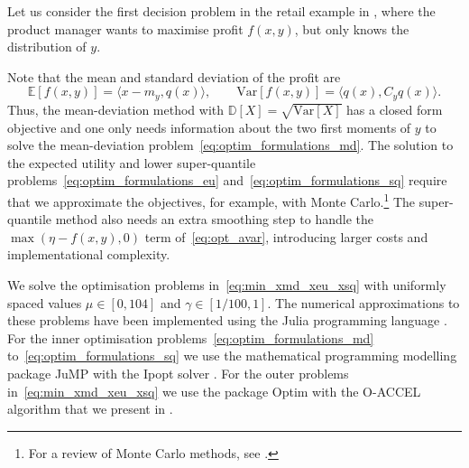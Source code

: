 \documentclass[main.tex]{subfiles}
\begin{document}
\begin{example}
  Let us consider the first decision problem in the retail example in
  , where the product manager wants
  to maximise profit $f(x,y)$, but only knows the distribution of $y$.

  Note that the mean and standard deviation of the profit are
  \begin{equation}
    \mathbb{E}[f(x,y)]
    = \langle x-m_y,q(x) \rangle,\qquad
    \mbox{Var}[f(x,y)]
    = \langle q(x),C_y q(x) \rangle.
  \end{equation}
  Thus, the mean-deviation method with
  $\mathbb{D}[X]=\sqrt{\mbox{Var}[X]}$ has a closed form objective and
  one only needs information about the two first moments of $y$ to solve
  the mean-deviation problem~\eqref{eq:optim_formulations_md}.
  The solution to the expected utility and lower super-quantile
  problems~\eqref{eq:optim_formulations_eu}
  and~\eqref{eq:optim_formulations_sq} require that we approximate the
  objectives, for example, with Monte Carlo.\footnote{For a review of
    Monte Carlo methods, see \citep{caflisch1998monte}.}
  The super-quantile method also needs an extra smoothing step to
  handle the $\max(\eta-f(x,y),0)$ term of~\eqref{eq:opt_avar},
  introducing larger costs and implementational complexity.

  We solve the optimisation problems in~\eqref{eq:min_xmd_xeu_xsq} with
  uniformly spaced  values \linebreak[4] $\mu\in[0,104]$ and $\gamma\in[1/100, 1]$.
  The numerical approximations to these problems have been implemented
  using the Julia programming language \citep{bezanson2017julia}.
  For the inner optimisation problems~\eqref{eq:optim_formulations_md}
  to~\eqref{eq:optim_formulations_sq} we use the mathematical
  programming modelling package JuMP
  \citep{dunning2017jump} with the Ipopt solver
  \citep{wachter2006implementation}. For the outer
  problems in~\eqref{eq:min_xmd_xeu_xsq} we use the package Optim
  \citep{mogensen2018optim} with the O-ACCEL algorithm that we
  present in .


\end{example}
\end{document}
